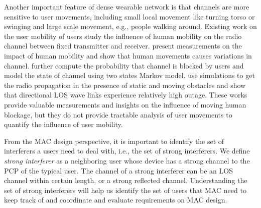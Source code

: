 \documentclass[10pt, conference, letterpaper]{IEEEtran}
\begin{document}
Another important feature of dense wearable network is that channels are more sensitive to user movements, including small local movement like turning torso or swinging and large scale movement, e.g., people walking around. Existing work on the user mobility of users \cite{humanactivity}\cite{blockagein60ghz}\cite{timevaryingpathshadowing} study the influence of human mobility on the radio channel between fixed transmitter and receiver. \cite{humanactivity}\cite{timevaryingpathshadowing} present measurements on the impact of human mobility and show that human movements causes variations in channel. \cite{timevaryingpathshadowing} further compute the probability that channel is blocked by users and model the state of channel using two states Markov model. 
\cite{blockagein60ghz} use simulations to get the radio propagation in the presence of static and moving obstacles and show that directional LOS wave links experience relatively high outage. These works provide valuable measurements and insights on the influence of moving human blockage, but they do not provide tractable analysis of user movements to quantify the influence of user mobility.





From the MAC design perspective, it is important to identify the set of interferers a users need to deal with, i.e., the set of strong interferers. We define \emph{strong interferer} as a neighboring user whose device has a strong channel to the PCP of the typical user. The channel of a strong interferer can be an LOS channel within certain length, or a strong reflected channel. Understanding the set of strong interferers will help us identify the set of users that MAC need to keep track of and coordinate and evaluate requirements on MAC design.
\end{document}
